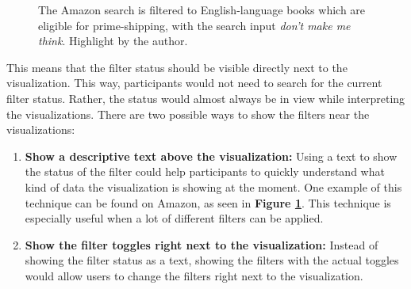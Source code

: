 \begin{figure}[htbp]
    \caption{The Amazon search is filtered to English-language books which are eligible for prime-shipping, with the search input \emph{don't make me think}. Highlight by the author.}
    \label{fig:amazon_filters}
\end{figure}

This means that the filter status should be visible directly next to the visualization. This way, participants would not need to search for the current filter status. Rather, the status would almost always be in view while interpreting the visualizations. There are two possible ways to show the filters near the visualizations:
\begin{enumerate}
    \item \textbf{Show a descriptive text above the visualization:} Using a text to show the status of the filter could help participants to quickly understand what kind of data the visualization is showing at the moment. One example of this technique can be found on Amazon, as seen in \textbf{Figure \ref{fig:amazon_filters}}. This technique is especially useful when a lot of different filters can be applied.
    \item \textbf{Show the filter toggles right next to the visualization:} Instead of showing the filter status as a text, showing the filters with the actual toggles would allow users to change the filters right next to the visualization.
\end{enumerate}

